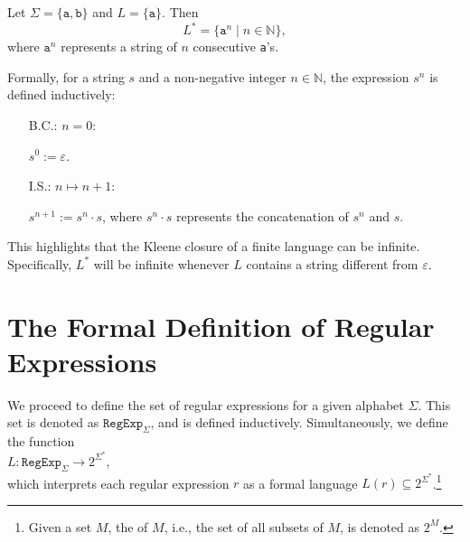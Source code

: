 \exampleEng
Let \( \Sigma = \{ \texttt{a}, \texttt{b} \} \) and \( L = \{ \texttt{a} \} \). Then
\[
L^* = \{ \texttt{a}^n \mid n \in \mathbb{N} \},
\]
where \( \texttt{a}^n \) represents a string of \( n \) consecutive \texttt{a}'s. \eox

Formally, for a string \( s \) and a non-negative integer \( n \in \mathbb{N} \), the expression \( s^n \) is defined inductively:
\begin{enumerate}
\item[B.C.:] \( n = 0 \):

             \( s^0 := \varepsilon \).
\item[I.S.:] \( n \mapsto n + 1 \):

             \( s^{n+1} := s^n \cdot s \),  \quad where \( s^n \cdot s \) represents the concatenation of \( s^n \) and \( s \).
\eox
\end{enumerate}

This highlights that the Kleene closure of a finite language can be infinite. Specifically, \( L^* \) will be infinite whenever \( L \) contains a string different from \( \varepsilon \).


\section{The Formal Definition of Regular Expressions}
We proceed to define the set of regular expressions for a given alphabet \( \Sigma \). This set is denoted as
\( \texttt{RegExp}_\Sigma \), and is defined inductively. Simultaneously, we define the function 
\\[0.2cm]
\hspace*{1.3cm}
$L: \texttt{RegExp}_\Sigma \rightarrow 2^{\Sigma^*}$,
\\[0.2cm]
which interprets each regular expression \( r \) as a formal language \( L(r) \subseteq 2^{\Sigma^*} \).\footnote{
  Given a set \( M \), the  of \( M \), i.e., the set of all subsets of \( M \), is denoted as \( 2^M \).
}
\pagebreak

